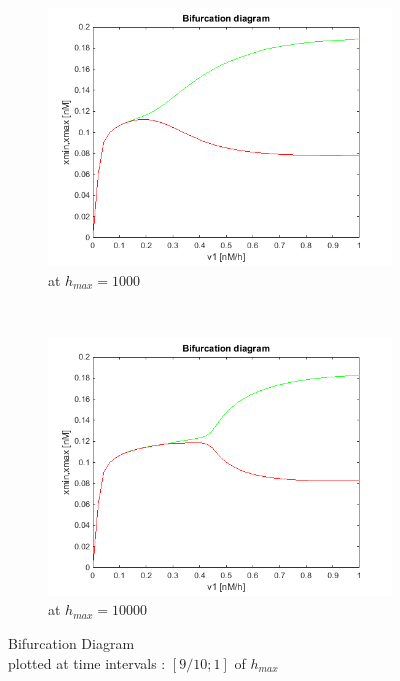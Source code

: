\documentclass[10pt,a4paper,oneside,twocolumn]{article}
\numberwithin{equation}{section} %
\begin{document}
    \begin{figure}
	\centering
	    \begin{subfigure}[b]{0.45\textwidth}
		\includegraphics[width=\textwidth]{Bifurcation.png}
		\caption{at $h_{max}=1000$}
	    \end{subfigure}
	     ~ 
	    \begin{subfigure}[b]{0.45\textwidth}
		\includegraphics[width=\textwidth]{Bifurcation10000.png}
		\caption{at $h_{max}=10000$}
	    \end{subfigure}
	    \caption{Bifurcation Diagram\\ plotted at time intervals : $[9/10; 1]$ of $h_{max}$}
    \end{figure}
\end{document}
